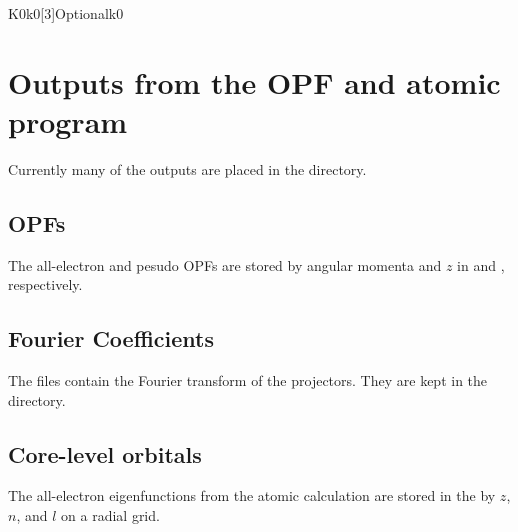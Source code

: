 \documentclass[11pt]{report}
\begin{document}
\begin{Card}{K0}{k0[3]}{Optional}{k0}


\section{Outputs from the OPF and atomic program}
Currently many of the outputs are placed in the  directory.

\subsection{OPFs}
The all-electron and pesudo OPFs are stored by angular momenta and $z$ in  and , respectively.

\subsection{Fourier Coefficients}
The  files contain the Fourier transform of the projectors. They are kept in the  directory.

\subsection{Core-level orbitals}
The all-electron eigenfunctions from the atomic calculation are stored in the  by $z$, $n$, and $l$ on a radial grid.


\end{Card}
\end{document}
